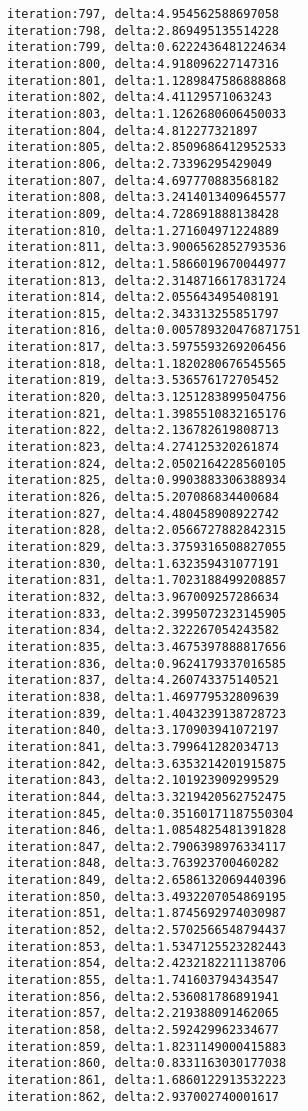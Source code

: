 \documentclass[11pt]{article}
\begin{document}
\begin{Verbatim}[commandchars=\\\{\}]
iteration:797, delta:4.954562588697058
iteration:798, delta:2.869495135514228
iteration:799, delta:0.6222436481224634
iteration:800, delta:4.918096227147316
iteration:801, delta:1.1289847586888868
iteration:802, delta:4.41129571063243
iteration:803, delta:1.1262680606450033
iteration:804, delta:4.812277321897
iteration:805, delta:2.8509686412952533
iteration:806, delta:2.73396295429049
iteration:807, delta:4.697770883568182
iteration:808, delta:3.2414013409645577
iteration:809, delta:4.728691888138428
iteration:810, delta:1.271604971224889
iteration:811, delta:3.9006562852793536
iteration:812, delta:1.5866019670044977
iteration:813, delta:2.3148716617831724
iteration:814, delta:2.055643495408191
iteration:815, delta:2.343313255851797
iteration:816, delta:0.005789320476871751
iteration:817, delta:3.5975593269206456
iteration:818, delta:1.1820280676545565
iteration:819, delta:3.536576172705452
iteration:820, delta:3.1251283899504756
iteration:821, delta:1.3985510832165176
iteration:822, delta:2.136782619808713
iteration:823, delta:4.274125320261874
iteration:824, delta:2.0502164228560105
iteration:825, delta:0.9903883306388934
iteration:826, delta:5.207086834400684
iteration:827, delta:4.480458908922742
iteration:828, delta:2.0566727882842315
iteration:829, delta:3.3759316508827055
iteration:830, delta:1.632359431077191
iteration:831, delta:1.7023188499208857
iteration:832, delta:3.967009257286634
iteration:833, delta:2.3995072323145905
iteration:834, delta:2.322267054243582
iteration:835, delta:3.4675397888817656
iteration:836, delta:0.9624179337016585
iteration:837, delta:4.260743375140521
iteration:838, delta:1.469779532809639
iteration:839, delta:1.4043239138728723
iteration:840, delta:3.170903941072197
iteration:841, delta:3.799641282034713
iteration:842, delta:3.6353214201915875
iteration:843, delta:2.101923909299529
iteration:844, delta:3.3219420562752475
iteration:845, delta:0.35160171187550304
iteration:846, delta:1.0854825481391828
iteration:847, delta:2.7906398976334117
iteration:848, delta:3.763923700460282
iteration:849, delta:2.6586132069440396
iteration:850, delta:3.4932207054869195
iteration:851, delta:1.8745692974030987
iteration:852, delta:2.5702566548794437
iteration:853, delta:1.5347125523282443
iteration:854, delta:2.4232182211138706
iteration:855, delta:1.741603794343547
iteration:856, delta:2.536081786891941
iteration:857, delta:2.219388091462065
iteration:858, delta:2.592429962334677
iteration:859, delta:1.8231149000415883
iteration:860, delta:0.8331163030177038
iteration:861, delta:1.6860122913532223
iteration:862, delta:2.937002740001617

\end{Verbatim}
\end{document}
